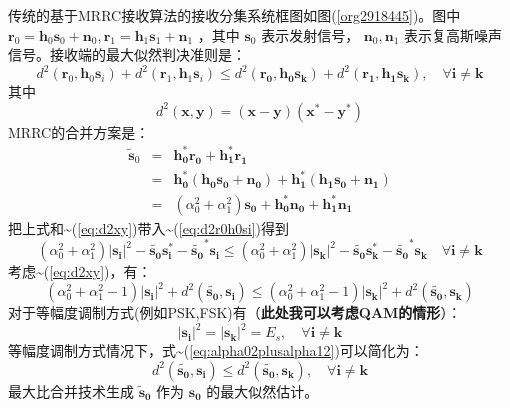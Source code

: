 \documentclass[10pt,a4paper,UTF8]{article}
\begin{document}
传统的基于MRRC接收算法的接收分集系统框图如图(\ref{org2918445})。图中 \(\mathbf{r}_0 = \mathbf{h}_0\mathbf{s}_0 + \mathbf{n}_0,\mathbf{r}_1 =\mathbf{h}_1\mathbf{s}_1 + \mathbf{n}_1\) ，其中 \(\mathbf{s}_0\) 表示发射信号， \(\mathbf{n}_0,\mathbf{n}_1\) 表示复高斯噪声信号。接收端的最大似然判决准则是：
\begin{equation}
  \label{eq:d2r0h0si}
  d^2(\pmb{r}_0,\pmb{h}_0\pmb{s}_i) + d^2(\pmb{r}_1,\pmb{h}_1\pmb{s}_i) \le d^2 (\pmb{r_0},\pmb{h_0s_k}) + d^2 (\pmb{r_1},\pmb{h_1s_k}), \quad \forall \pmb{i}\neq \pmb{k}
\end{equation}
其中
\begin{equation}
d^2(\pmb{x},\pmb{y}) = (\pmb{x}- \pmb{y})(\pmb{x^*}- \pmb{y^*})\label{eq:d2xy}
\end{equation}
MRRC的合并方案是：
\begin{eqnarray}
  \tilde{\pmb{s}}_0&=& \pmb{h_0^*r_0} + \pmb{h_1^*r_1} \nonumber \\
                      &=& \pmb{h_0^*}(\pmb{h_0s_0}+ \pmb{n_0}) +\pmb{h_1^*}(\pmb{h_1s_0}+ \pmb{n_1})  \nonumber \\
                      &=& (\alpha_0^2 + \alpha_1^2) \pmb{s_0} + \pmb{h_0^*n_0} + \pmb{h_1^*n_1}
\end{eqnarray}
把上式和\textasciitilde{}(\ref{eq:d2xy})带入\textasciitilde{}(\ref{eq:d2r0h0si})得到
\begin{equation}
  \label{eq:alpha0alpha1}
  (\alpha_0^2+ \alpha_1^2) |\pmb{s_i}|^2 -\pmb{\tilde{s_0}s_i^*} - \pmb{\tilde{s_0}^*s_i}\le (\alpha_0^2+ \alpha_1^2) |\pmb{s_k}|^2 -\pmb{\tilde{s_0}s_k^*} - \pmb{\tilde{s_0}^*s_k}  \quad \forall \pmb{i}\neq \pmb{k}
\end{equation}
考虑\textasciitilde{}(\ref{eq:d2xy})，有：
\begin{equation}
  \label{eq:alpha02plusalpha12}
  (\alpha_0^2 + \alpha_1^2 -1) |\pmb{s_i}|^2 + d^2 (\pmb{\tilde{s_0}},\pmb{s_i} ) \le   (\alpha_0^2 + \alpha_1^2 -1) |\pmb{s_k}|^2 + d^2 (\pmb{\tilde{s_0}},\pmb{s_k} )
\end{equation}
对于等幅度调制方式(例如PSK,FSK)有（\textbf{此处我可以考虑QAM的情形}）：
\begin{equation}
  \label{eq:si2equationsk2}
  |\pmb{s_i}|^2 = |\pmb{s_k}|^2 =E_s, \quad \forall \pmb{i} \ne \pmb{k}
\end{equation}
等幅度调制方式情况下，式\textasciitilde{}(\ref{eq:alpha02plusalpha12})可以简化为：
\begin{equation}
  \label{eq:d2s0si}
  d^2(\tilde{\pmb{s_0}},\pmb{s_i}) \le d^2(\tilde{\pmb{s_0}},\pmb{s_k}), \quad \forall \pmb{i}\neq \pmb{k}
\end{equation}
最大比合并技术生成 \(\pmb{\tilde{s}_0}\) 作为 \(\pmb{s_0}\) 的最大似然估计。
\end{document}
